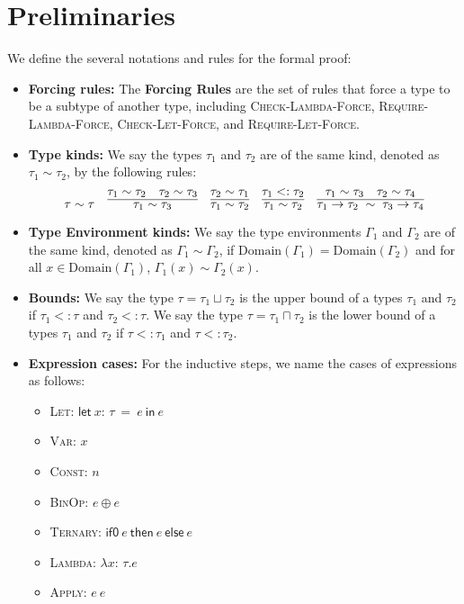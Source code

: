 \documentclass[peerreview, 10pt]{IEEEtran}
\newcommand{\lett}[4]{\ensuremath{\mathsf{let}\ #1\mathsf{:}\,#2\ \mathsf{=}\ #3\ \mathsf{in}\ #4}}
\newcommand{\binop}[2]{\ensuremath{#1\ \mathsf{\oplus}\ #2}}
\newcommand{\ternary}[3]{\ensuremath{\mathsf{if0}\ #1\ \mathsf{then}\ #2\ \mathsf{else}\ #3}}
\newcommand{\funct}[3]{\ensuremath{\lambda #1\mathsf{:}\,#2.#3}}
\newcommand{\apply}[2]{\ensuremath{#1\ #2}}
\newcommand{\arrowt}[2]{\ensuremath{{#1}\rightarrow{#2}}}
\begin{document}
\appendix

\newtheorem{lemma}{Lemma}
\newtheorem{theorem}{Theorem}

\section*{Preliminaries}

We define the several notations and rules for the formal proof:

\begin{itemize}
    \item \textbf{Forcing rules:} The \textbf{Forcing Rules} are the set of rules that force a type to be a subtype of another type, including \textsc{Check-Lambda-Force}, \textsc{Require-Lambda-Force}, \textsc{Check-Let-Force}, and \textsc{Require-Let-Force}.
    \item \textbf{Type kinds:} We say the types $\tau_1$ and $\tau_2$ are of the same kind, denoted as $\tau_1 \sim \tau_2$, by the following rules:
    \[\tau\sim\tau\quad\infer{\tau_1\sim\tau_3}{\tau_1\sim\tau_2\quad\tau_2\sim\tau_3}\quad\infer{\tau_1\sim\tau_2}{\tau_2\sim\tau_1}\quad\infer{\tau_1\sim\tau_2}{\tau_1<:\tau_2}\quad\infer{\arrowt{\tau_1}{\tau_2}\;\sim\;\arrowt{\tau_3}{\tau_4}}{\tau_1\sim\tau_3\quad\tau_2\sim\tau_4}\]
    \item \textbf{Type Environment kinds:} We say the type environments $\Gamma_1$ and $\Gamma_2$ are of the same kind, denoted as $\Gamma_1 \sim \Gamma_2$, if $\text{Domain}(\Gamma_1) = \text{Domain}(\Gamma_2)$ and for all $x \in \text{Domain}(\Gamma_1)$, $\Gamma_1(x) \sim \Gamma_2(x)$.
    \item \textbf{Bounds:} We say the type $\tau=\tau_1 \sqcup \tau_2$ is the upper bound of a types $\tau_1$ and $\tau_2$ if $\tau_1 <: \tau$ and $\tau_2 <: \tau$. We say the type $\tau=\tau_1 \sqcap \tau_2$ is the lower bound of a types $\tau_1$ and $\tau_2$ if $\tau <: \tau_1$ and $\tau <: \tau_2$.
    \item \textbf{Expression cases:} For the inductive steps, we name the cases of expressions as follows:
    \begin{itemize}
        \item \textsc{Let}: \lett{x}{\tau}{e}{e}
        \item \textsc{Var}: $x$
        \item \textsc{Const}: $n$
        \item \textsc{BinOp}: \binop{e}{e}
        \item \textsc{Ternary}: \ternary{e}{e}{e}
        \item \textsc{Lambda}: \funct{x}{\tau}{e}
        \item \textsc{Apply}: \apply{e}{e}
    \end{itemize}


\end{itemize}
\end{document}
